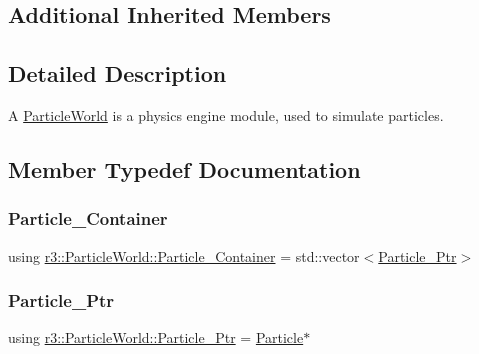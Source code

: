 \subsection*{Additional Inherited Members}


\subsection{Detailed Description}
A \mbox{\hyperlink{classr3_1_1_particle_world}{Particle\+World}} is a physics engine module, used to simulate particles. 

\subsection{Member Typedef Documentation}
\mbox{\label{classr3_1_1_particle_world_aa354f6786c0837674fe8286f00465631}} 
\subsubsection{\texorpdfstring{Particle\+\_\+\+Container}{Particle\_Container}}
{\footnotesize\ttfamily using \mbox{\hyperlink{classr3_1_1_particle_world_aa354f6786c0837674fe8286f00465631}{r3\+::\+Particle\+World\+::\+Particle\+\_\+\+Container}} =  std\+::vector$<$\mbox{\hyperlink{classr3_1_1_particle_world_a12b4624a202a6b22629a3328f083ac81}{Particle\+\_\+\+Ptr}}$>$}

\mbox{\label{classr3_1_1_particle_world_a12b4624a202a6b22629a3328f083ac81}} 
\subsubsection{\texorpdfstring{Particle\+\_\+\+Ptr}{Particle\_Ptr}}
{\footnotesize\ttfamily using \mbox{\hyperlink{classr3_1_1_particle_world_a12b4624a202a6b22629a3328f083ac81}{r3\+::\+Particle\+World\+::\+Particle\+\_\+\+Ptr}} =  \mbox{\hyperlink{classr3_1_1_particle}{Particle}}$\ast$}



